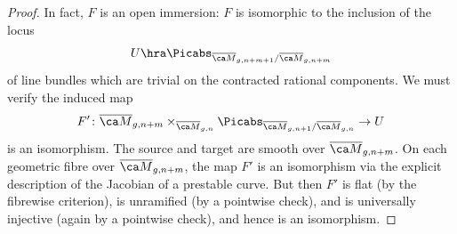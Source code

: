 \begin{proof}
In fact, $F$ is an open immersion: $F$ is isomorphic to the inclusion of the locus $$U \hra \Picabs_{\Mbar_{g,n+m+1}/\Mbar_{g,n+m}}$$ of line bundles which are trivial on the contracted rational components.
We must verify  the induced map
$$F'\colon \Mbar_{g,n+m} \times_{\Mbar_{g,n}} \Picabs_{\Mbar_{g,n+1}/\Mbar_{g,n}} \to U$$
is an isomorphism. The source and target are smooth over $\Mbar_{g, n + m}$. On each geometric fibre over $\Mbar_{g, n + m}$, the map $F'$ is an isomorphism via the explicit description of the Jacobian of a prestable curve. But then $F'$ is  flat (by the fibrewise criterion), is unramified (by a pointwise check), and is universally injective (again by a pointwise check), and hence is an isomorphism. %
\end{proof}
